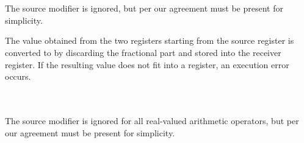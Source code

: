 \vspace{-0.35cm}
\paragraph{}\

The source modifier is ignored, but per our agreement must be present for
simplicity.

The  value obtained from the two registers starting from the source
register is converted to  by discarding the fractional part
and stored into the receiver register.
If the resulting value does not fit into a register, an execution error occurs.

\vspace{-0.35cm}
\paragraph{}\

The source modifier is ignored for all real-valued arithmetic operators,
but per our agreement must be present for simplicity.
